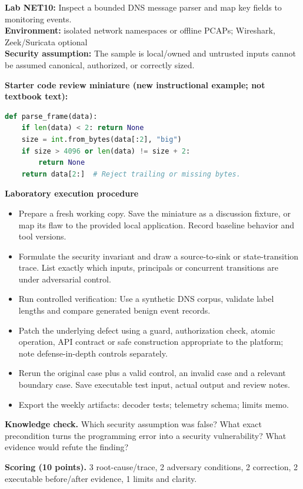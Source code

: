 \documentclass[10pt,letterpaper]{article}
\begin{document}
\begin{insight}\textbf{Lab NET10:} Inspect a bounded DNS message parser and map key fields to monitoring events.\\\textbf{Environment:} isolated network namespaces or offline PCAPs; Wireshark, Zeek/Suricata optional\\\textbf{Security assumption:} The sample is local/owned and untrusted inputs cannot be assumed canonical, authorized, or correctly sized.\end{insight}
\textbf{Starter code review miniature (new instructional example; not textbook text):}
\begin{lstlisting}[language=Python]
def parse_frame(data):
    if len(data) < 2: return None
    size = int.from_bytes(data[:2], "big")
    if size > 4096 or len(data) != size + 2:
        return None
    return data[2:]  # Reject trailing or missing bytes.
\end{lstlisting}
\textbf{Laboratory execution procedure}
\begin{itemize}[leftmargin=*,itemsep=2pt]
\item Prepare a fresh working copy. Save the miniature as a discussion fixture, or map its flaw to the provided local application. Record baseline behavior and tool versions.
\item Formulate the security invariant and draw a source-to-sink or state-transition trace. List exactly which inputs, principals or concurrent transitions are under adversarial control.
\item Run controlled verification: Use a synthetic DNS corpus, validate label lengths and compare generated benign event records.
\item Patch the underlying defect using a guard, authorization check, atomic operation, API contract or safe construction appropriate to the platform; note defense-in-depth controls separately.
\item Rerun the original case plus a valid control, an invalid case and a relevant boundary case. Save executable test input, actual output and review notes.
\item Export the weekly artifacts: decoder tests; telemetry schema; limits memo.
\end{itemize}
\textbf{Knowledge check.} Which security assumption was false? What exact precondition turns the programming error into a security vulnerability? What evidence would refute the finding?

\textbf{Scoring (10 points).} 3 root-cause/trace, 2 adversary conditions, 2 correction, 2 executable before/after evidence, 1 limits and clarity.
\end{document}
